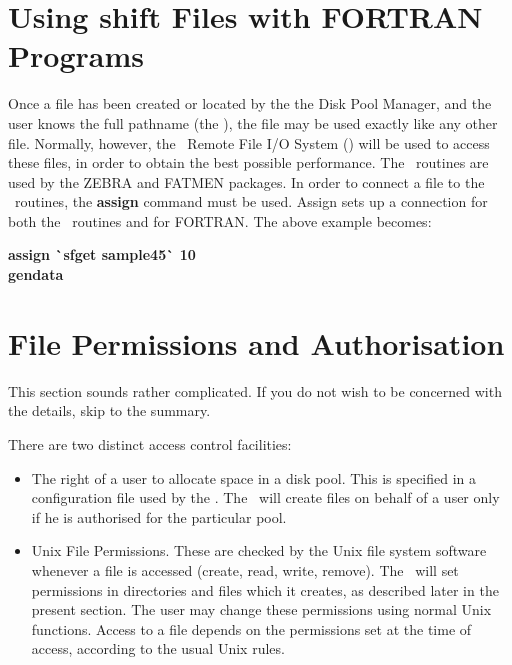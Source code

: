 \section{Using shift Files with FORTRAN Programs}
 
Once a file has been created or located by the the Disk Pool Manager,
and the user knows the full pathname (the {\it \nfspn}), the file may be used
exactly like any other file.
Normally, however, the \shift\ Remote File I/O System (\RFIO) will be used to
access these files, in order to obtain the best possible performance.
The \RFIO\ routines are used by the ZEBRA and FATMEN packages. In order to
 connect
a file to the \RFIO\ routines, the {\bf assign} command
must be used. Assign sets up a connection for both the \RFIO\ routines and
for FORTRAN. The above example becomes:
 
 
{\bf assign \`{}sfget sample45\`{} 10\\
gendata}
 
 
\section{File Permissions and Authorisation}
\label{sec:permissions}
 
This section sounds rather complicated. If you do not wish to be concerned with
the details, skip to the summary.
 
There are two distinct access control facilities:
\begin{itemize}
\item The right of a user to
allocate space in a disk pool. This is specified in
a configuration file used by the \DPM.
The \DPM\ will create files on behalf of a user only if
he is authorised for the particular pool.
\item Unix File Permissions. These are checked by the Unix file system software
whenever a file is accessed (create, read, write, remove). The \DPM\
will set permissions in directories and files which it creates, as described
 later in
the present section. The user may change these permissions using normal
Unix functions. Access to a file depends on the permissions set at the time of
access, according to the usual Unix rules.
\end{itemize}
 
